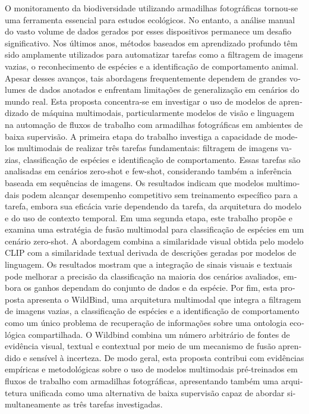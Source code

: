\begin{otherlanguage}{portuguese}
O monitoramento da biodiversidade utilizando armadilhas fotográficas tornou-se uma ferramenta essencial para estudos ecológicos. No entanto, a análise manual do vasto volume de dados gerados por esses dispositivos permanece um desafio significativo. Nos últimos anos, métodos baseados em aprendizado profundo têm sido amplamente utilizados para automatizar tarefas como a filtragem de imagens vazias, o reconhecimento de espécies e a identificação de comportamento animal. Apesar desses avanços, tais abordagens frequentemente dependem de grandes volumes de dados anotados e enfrentam limitações de generalização em cenários do mundo real. Esta proposta concentra-se em investigar o uso de modelos de aprendizado de máquina multimodais, particularmente modelos de visão e linguagem na automação de fluxos de trabalho com armadilhas fotográficas em ambientes de baixa supervisão. A primeira etapa do trabalho investiga a capacidade de modelos multimodais de realizar três tarefas fundamentais: filtragem de imagens vazias, classificação de espécies e identificação de comportamento. Essas tarefas são analisadas em cenários zero-shot e few-shot, considerando também a inferência baseada em sequências de imagens. Os resultados indicam que modelos multimodais podem alcançar desempenho competitivo sem treinamento específico para a tarefa, embora sua eficácia varie dependendo da tarefa, da arquitetura do modelo e do uso de contexto temporal. Em uma segunda etapa, este trabalho propõe e examina uma estratégia de fusão multimodal para classificação de espécies em um cenário zero-shot. A abordagem combina a similaridade visual obtida pelo modelo CLIP com a similaridade textual derivada de descrições geradas por modelos de linguagem. Os resultados mostram que a integração de sinais visuais e textuais pode melhorar a precisão da classificação na maioria dos cenários avaliados, embora os ganhos dependam do conjunto de dados e da espécie. Por fim, esta proposta apresenta o WildBind, uma arquitetura multimodal que integra a filtragem de imagens vazias, a classificação de espécies e a identificação de comportamento como um único problema de recuperação de informações sobre uma ontologia ecológica compartilhada. O Wildbind combina um número arbitrário de fontes de evidência visual, textual e contextual por meio de um mecanismo de fusão aprendido e sensível à incerteza. De modo geral, esta proposta contribui com evidências empíricas e metodológicas sobre o uso de modelos multimodais pré-treinados em fluxos de trabalho com armadilhas fotográficas, apresentando também uma arquitetura unificada como uma alternativa
de baixa supervisão capaz de abordar simultaneamente as três tarefas investigadas.


\end{otherlanguage}

